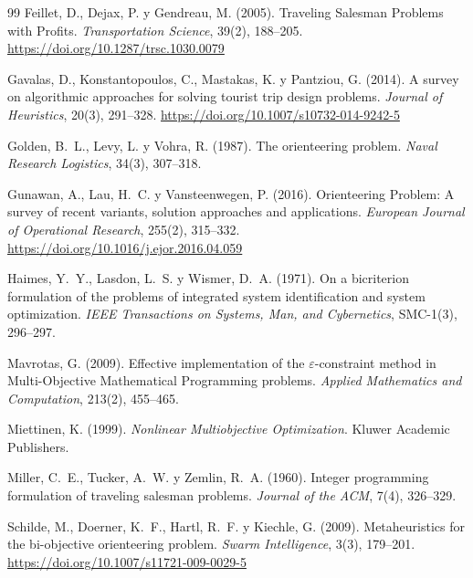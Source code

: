 \begin{thebibliography}{99}
Feillet, D., Dejax, P. y Gendreau, M. (2005).
\newblock Traveling Salesman Problems with Profits.
\newblock \emph{Transportation Science}, 39(2), 188--205.
\newblock \url{https://doi.org/10.1287/trsc.1030.0079}

Gavalas, D., Konstantopoulos, C., Mastakas, K. y Pantziou, G. (2014).
\newblock A survey on algorithmic approaches for solving tourist trip design problems.
\newblock \emph{Journal of Heuristics}, 20(3), 291--328.
\newblock \url{https://doi.org/10.1007/s10732-014-9242-5}

Golden, B.~L., Levy, L. y Vohra, R. (1987).
\newblock The orienteering problem.
\newblock \emph{Naval Research Logistics}, 34(3), 307--318.

Gunawan, A., Lau, H.~C. y Vansteenwegen, P. (2016).
\newblock Orienteering Problem: A survey of recent variants, solution approaches and applications.
\newblock \emph{European Journal of Operational Research}, 255(2), 315--332.
\newblock \url{https://doi.org/10.1016/j.ejor.2016.04.059}

Haimes, Y.~Y., Lasdon, L.~S. y Wismer, D.~A. (1971).
\newblock On a bicriterion formulation of the problems of integrated system identification and system optimization.
\newblock \emph{IEEE Transactions on Systems, Man, and Cybernetics}, SMC-1(3), 296--297.

Mavrotas, G. (2009).
\newblock Effective implementation of the $\varepsilon$-constraint method in Multi-Objective Mathematical Programming problems.
\newblock \emph{Applied Mathematics and Computation}, 213(2), 455--465.

Miettinen, K. (1999).
\newblock \emph{Nonlinear Multiobjective Optimization}.
\newblock Kluwer Academic Publishers.

Miller, C.~E., Tucker, A.~W. y Zemlin, R.~A. (1960).
\newblock Integer programming formulation of traveling salesman problems.
\newblock \emph{Journal of the ACM}, 7(4), 326--329.

Schilde, M., Doerner, K.~F., Hartl, R.~F. y Kiechle, G. (2009).
\newblock Metaheuristics for the bi-objective orienteering problem.
\newblock \emph{Swarm Intelligence}, 3(3), 179--201.
\newblock \url{https://doi.org/10.1007/s11721-009-0029-5}


\end{thebibliography}

